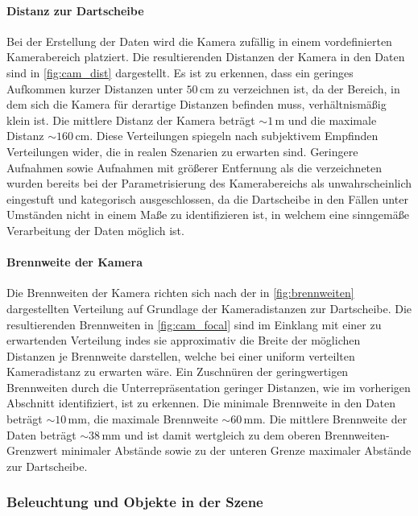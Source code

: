 \paragraph{Distanz zur Dartscheibe}

Bei der Erstellung der Daten wird die Kamera zufällig in einem vordefinierten Kamerabereich platziert. Die resultierenden Distanzen der Kamera in den Daten sind in \autoref{fig:cam_dist} dargestellt. Es ist zu erkennen, dass ein geringes Aufkommen kurzer Distanzen unter $50\,\text{cm}$ zu verzeichnen ist, da der Bereich, in dem sich die Kamera für derartige Distanzen befinden muss, verhältnismäßig klein ist. Die mittlere Distanz der Kamera beträgt $\sim1\,\text{m}$ und die maximale Distanz $\sim160\,\text{cm}$. Diese Verteilungen spiegeln nach subjektivem Empfinden Verteilungen wider, die in realen Szenarien zu erwarten sind. Geringere Aufnahmen sowie Aufnahmen mit größerer Entfernung als die verzeichneten wurden bereits bei der Parametrisierung des Kamerabereichs als unwahrscheinlich eingestuft und kategorisch ausgeschlossen, da die Dartscheibe in den Fällen unter Umständen nicht in einem Maße zu identifizieren ist, in welchem eine sinngemäße Verarbeitung der Daten möglich ist.

\paragraph{Brennweite der Kamera}

Die Brennweiten der Kamera richten sich nach der in \autoref{fig:brennweiten} dargestellten Verteilung auf Grundlage der Kameradistanzen zur Dartscheibe. Die resultierenden Brennweiten in \autoref{fig:cam_focal} sind im Einklang mit einer zu erwartenden Verteilung indes sie approximativ die Breite der möglichen Distanzen je Brennweite darstellen, welche bei einer uniform verteilten Kameradistanz zu erwarten wäre. Ein Zuschnüren der geringwertigen Brennweiten durch die Unterrepräsentation geringer Distanzen, wie im vorherigen Abschnitt identifiziert, ist zu erkennen. Die minimale Brennweite in den Daten beträgt $\sim10\,\text{mm}$, die maximale Brennweite $\sim60\,\text{mm}$. Die mittlere Brennweite der Daten beträgt $\sim38\,\text{mm}$ und ist damit wertgleich zu dem oberen Brennweiten-Grenzwert minimaler Abstände sowie zu der unteren Grenze maximaler Abstände zur Dartscheibe.

\subsubsection{Beleuchtung und Objekte in der Szene}
\label{sec:beleuchtung_ergebnisse}


